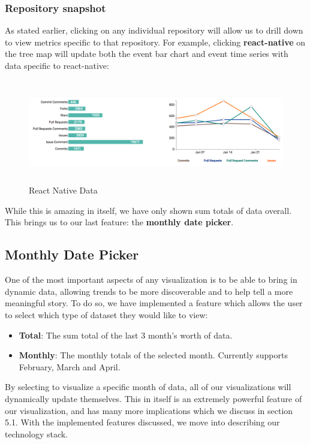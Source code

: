\documentclass{article}
\begin{document}
\subsubsection {Repository snapshot}

As stated earlier, clicking on any individual repository will allow us to drill down to view metrics specific to that repository. For example, clicking \textbf{react-native} on the tree map will update both the event bar chart and event time series with data specific to react-native:

\begin{figure}[h!]
\centering
\includegraphics[height=4.5cm, width=17cm]{native}
\caption{React Native Data}
\end{figure}

While this is amazing in itself, we have only shown sum totals of data overall. This brings us to our last feature: the \textbf{monthly date picker}.

\subsection {Monthly Date Picker}

One of the most important aspects of any visualization is to be able to bring in dynamic data, allowing trends to be more discoverable and to help tell a more meaningful story. To do so, we have implemented a feature which allows the user to select which type of dataset they would like to view:

\begin {itemize}
	\item \textbf{Total}: The sum total of the last 3 month's worth of data.
	\item \textbf{Monthly}: The monthly totals of the selected month. Currently supports February, March and April.
\end {itemize}

By selecting to visualize a specific month of data, all of our visualizations will dynamically update themselves. This in itself is an extremely powerful feature of our visualization, and has many more implications which we discuss in section 5.1. With the implemented features discussed, we move into describing our technology stack.
\end{document}
